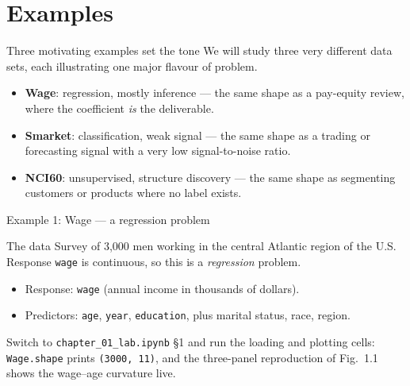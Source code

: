\documentclass[aspectratio=169,11pt]{beamer}
\begin{document}
\section{Examples}

\begin{frame}{Three motivating examples set the tone}
  We will study three very different data sets, each illustrating one
  major flavour of problem.
  \begin{takeaway}
    \begin{itemize}
      \item \textbf{Wage}: regression, mostly inference --- the same
            shape as a pay-equity review, where the coefficient
            \emph{is} the deliverable.
      \item \textbf{Smarket}: classification, weak signal --- the same
            shape as a trading or forecasting signal with a very low
            signal-to-noise ratio.
      \item \textbf{NCI60}: unsupervised, structure discovery --- the
            same shape as segmenting customers or products where no
            label exists.
    \end{itemize}
  \end{takeaway}
\end{frame}

\begin{frame}{Example 1: Wage --- a regression problem}
  \begin{block}{The data}
    Survey of 3{,}000 men working in the central Atlantic region of
    the U.S. Response \texttt{wage} is continuous, so this is a
    \emph{regression} problem.
  \end{block}
  \begin{readme}[Variables]
    \begin{itemize}
      \item Response: \texttt{wage} (annual income in thousands of
            dollars).
      \item Predictors: \texttt{age}, \texttt{year},
            \texttt{education}, plus marital status, race, region.
    \end{itemize}
  \end{readme}
  \begin{labnote}
    Switch to \texttt{chapter\_01\_lab.ipynb} \S1 and run the loading and plotting cells: \texttt{Wage.shape} prints \texttt{(3000, 11)}, and the three-panel reproduction of Fig.~1.1 shows the wage--age curvature live.
  \end{labnote}
\end{frame}
\end{document}
